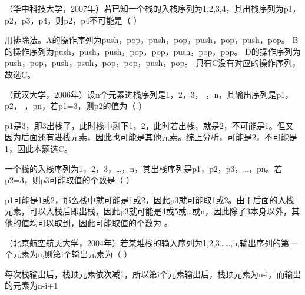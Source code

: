 \question （华中科技大学，2007年）若已知一个栈的入栈序列为1,2,3,4，其出栈序列为p1，p2，p3，p4，则p2，p4不可能是（
）
\par{}
\begin{solution}用排除法。A的操作序列为push，pop，push，pop，push，pop，push，pop。
B的操作序列为push，push，push，pop，pop，push，pop，pop。
D的操作序列为push，pop，push，psuh，pop，pop，push，pop。
只有C没有对应的操作序列，故选C。
\end{solution}
\question （武汉大学，2006年）设n个元素进栈序列是1，2，3，
，n，其输出序列是p1，p2， ，pn，若p1=3，则p2的值为（ ）
\par{}
\begin{solution}p1是3，即3出栈了，此时栈中剩下1，2，此时若出栈，就是2，不可能是1。但又因为后面还有进栈元素，因此也可能是其他元素。综上分析，可能是2，不可能是1，因此本题选C。
\end{solution}
\question 一个栈的入栈序列为1，2，3，\ldots{}，n，其出栈序列是p1，p2，p3，\ldots{}，pn。若p2=3，则p3可能取值的个数是（
）
\par{}
\begin{solution}p1可能是1或2，那么栈中就可能是1或2，因此p3就可能取1或2。由于后面的入栈元素，可以入栈后即出栈，因此p3就可能是4或5或\ldots{}或n，因此除了3本身以外，其他的值均可以取到，因此可能取值的个数为
。
\end{solution}
\question （北京航空航天大学，2004年）若某堆栈的输入序列为1,2,3\ldots{}\ldots{},n,输出序列的第一个元素为n,则第i个输出元素为（
）
\par{}
\begin{solution}每次栈输出后，栈顶元素依次减1，所以第i个元素输出后，栈顶元素为n-i，而输出的元素为n-i+1
\end{solution}
